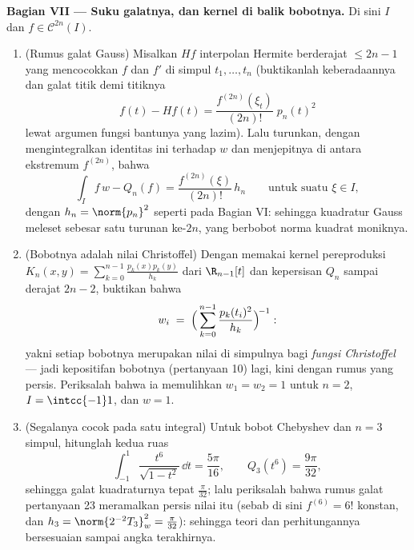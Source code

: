 \begin{problem}
\medskip
\noindent\textbf{Bagian VII --- Suku galatnya, dan kernel
di balik bobotnya.} Di sini $I$  dan $f \in \mathcal
C^{2n}(I)$.
\begin{enumerate}[resume]
  \item (Rumus galat Gauss) Misalkan $Hf$ interpolan Hermite
        berderajat $\leq 2n - 1$ yang mencocokkan $f$ dan
        $f'$ di simpul $t_1, \dots, t_n$ (buktikanlah
        keberadaannya dan galat titik demi titiknya
        \[
        f(t) - Hf(t) =
        \frac{f^{(2n)}(\xi_t)}{(2n)!}\;p_n(t)^2
        \]
        lewat argumen fungsi bantunya yang lazim). Lalu turunkan, dengan
        mengintegralkan identitas ini terhadap $w$ dan menjepitnya
        di antara ekstremum $f^{(2n)}$, bahwa
        \[
        \int_I f\,w - Q_n(f)
        = \frac{f^{(2n)}(\xi)}{(2n)!}\,h_n
        \qquad\text{untuk suatu } \xi \in I,
        \]
        dengan $h_n = \norm{p_n}^2$ seperti pada Bagian VI: sehingga kuadratur
        Gauss meleset sebesar satu turunan ke-$2n$, yang berbobot
        norma kuadrat  moniknya.
  \item (Bobotnya adalah nilai Christoffel) Dengan memakai
        kernel pereproduksi $K_n(x, y) = \sum_{k=0}^{n-1}
        \frac{p_k(x)p_k(y)}{h_k}$ dari $\R_{n-1}[t]$ dan
        kepersisan $Q_n$ sampai derajat $2n - 2$, buktikan bahwa
        \[
        w_i \;=\;
        \Bigl(\,\sum_{k=0}^{n-1}
        \frac{p_k(t_i)^2}{h_k}\Bigr)^{\!-1} :
        \]
        yakni setiap bobotnya merupakan nilai di simpulnya bagi
        \emph{fungsi Christoffel} --- jadi kepositifan
        bobotnya (pertanyaan 10) lagi, kini dengan rumus yang
        persis. Periksalah bahwa ia memulihkan $w_1 = w_2 = 1$ untuk $n =
        2$, $I = \intcc{-1}1$, dan $w = 1$.
  \item (Segalanya cocok pada satu integral) Untuk bobot Chebyshev
        dan $n = 3$ simpul, hitunglah kedua ruas
        \[
        \int_{-1}^{1}\frac{t^6}{\sqrt{1 - t^2}}\,\dd t
        = \frac{5\pi}{16},
        \qquad
        Q_3(t^6) = \frac{9\pi}{32},
        \]
        sehingga galat kuadraturnya tepat $\frac{\pi}{32}$;
        lalu periksalah bahwa rumus galat pertanyaan 23
        meramalkan persis nilai itu (sebab di sini $f^{(6)} = 6!$
        konstan, dan $h_3 = \norm{2^{-2}T_3}_w^2 =
        \frac\pi{32}$): sehingga teori dan perhitungannya bersesuaian sampai
        angka terakhirnya.

\end{enumerate}
\end{problem}
